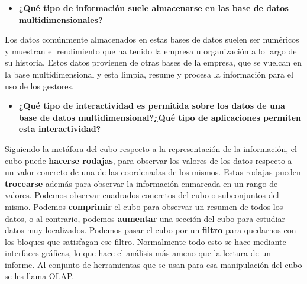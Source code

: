\documentclass[paper=a4, fontsize=11pt]{scrartcl} %
\begin{document}
\begin{itemize}
\item \textbf{¿Qué tipo de información suele almacenarse en las base de datos multidimensionales?}
\end{itemize}
Los datos comúnmente almacenados en estas bases de datos suelen ser numéricos y muestran el rendimiento que ha tenido la empresa u organización a lo largo de su historia. Estos datos provienen de otras bases de la empresa, que se vuelcan en la base multidimensional y esta limpia, resume y procesa la información para el uso de los gestores.

\begin{itemize}
\item \textbf{ ¿Qué tipo de interactividad es permitida sobre los datos de una base de datos multidimensional?¿Qué tipo de aplicaciones permiten esta interactividad?}
\end{itemize}
Siguiendo la metáfora del cubo respecto a la representación de la información, el cubo puede \textbf{hacerse rodajas}, para observar los valores de los datos respecto a un valor concreto de una de las coordenadas de los mismos. Estas rodajas pueden \textbf{trocearse} además para observar la información enmarcada en un rango de valores. Podemos observar cuadrados concretos del cubo o subconjuntos del mismo. Podemos \textbf{comprimir} el cubo para observar un resumen de todos los datos, o al contrario, podemos \textbf{aumentar} una sección del cubo para estudiar datos muy localizados. Podemos pasar el cubo por un \textbf{filtro} para quedarnos con los bloques que satisfagan ese filtro. Normalmente todo esto se hace mediante interfaces gráficas, lo que hace el análisis más ameno que la lectura de un informe. Al conjunto de herramientas que se usan para esa manipulación del cubo se les llama OLAP. 
\end{document}
